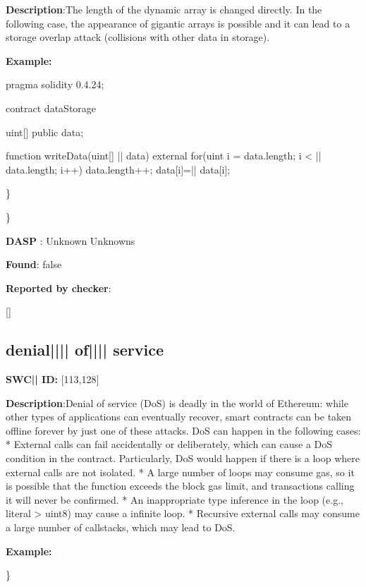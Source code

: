 \documentclass{article}
\begin{document}
\textbf{Description}:The length of the dynamic array is changed directly. In the following case, the appearance of gigantic arrays is possible and it can lead to a storage overlap attack (collisions with other data in storage).


\textbf{Example:} 
\begin{ffcode} 

pragma solidity 0.4.24;

contract dataStorage {
    uint[] public data;

    function writeData(uint[] |\textunderscore| data) external {
        for(uint i = data.length; i < |\textunderscore| data.length; i++) {
            data.length++;
            data[i]=|\textunderscore| data[i];
        }
    }
}

\end{ffcode} 
\} 

\} 

\textbf{DASP} : Unknown Unknowns

\textbf{Found}: false

\textbf{Reported by checker}: 
\begin{ffcode} 

[]
\end{ffcode} 
\subsection{denial{||\textunderscore|| }of{||\textunderscore|| }service} 
\textbf{SWC{|\textunderscore| }ID:} [113,128]

\textbf{Description}:Denial of service (DoS) is deadly in the world of Ethereum: while other types of applications can eventually recover, smart contracts can be taken offline forever by just one of these attacks. DoS can happen in the following cases:
* External calls can fail accidentally or deliberately, which can cause a DoS condition in the contract. Particularly, DoS would happen if there is a loop where external calls are not isolated.
* A large number of loops may consume gas, so it is possible that the function exceeds the block gas limit, and transactions calling it will never be confirmed.
* An inappropriate type inference in the loop (e.g., literal {\textendash}> uint8) may cause a infinite loop.
* Recursive external calls may consume a large number of callstacks, which may lead to DoS.


\textbf{Example:} 
\begin{ffcode} 

for (var i = 0; i < array.length; i++) { /* ... */

\end{ffcode} 
\} 
\end{document}
